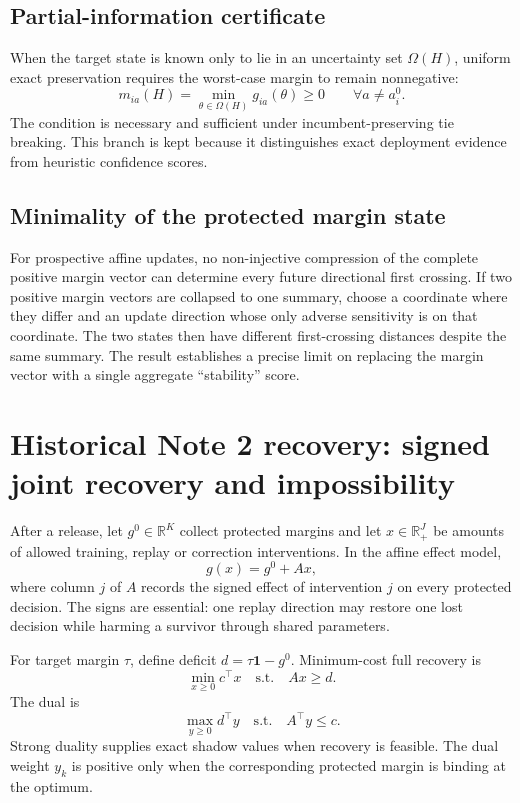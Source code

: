 \documentclass[11pt,letterpaper]{article}
\theoremstyle{plain}
\newcommand{\R}{\mathbb R}
\newcommand{\1}{\mathbf 1}
\begin{document}
\subsection{Partial-information certificate}
When the target state is known only to lie in an uncertainty set $\Omega(H)$, uniform exact preservation requires the worst-case margin to remain nonnegative:
\begin{equation}
 m_{ia}(H)=\min_{\theta\in\Omega(H)}g_{ia}(\theta)\ge0\qquad\forall a\ne a_i^0.
\end{equation}
The condition is necessary and sufficient under incumbent-preserving tie breaking. This branch is kept because it distinguishes exact deployment evidence from heuristic confidence scores.

\subsection{Minimality of the protected margin state}
For prospective affine updates, no non-injective compression of the complete positive margin vector can determine every future directional first crossing. If two positive margin vectors are collapsed to one summary, choose a coordinate where they differ and an update direction whose only adverse sensitivity is on that coordinate. The two states then have different first-crossing distances despite the same summary. The result establishes a precise limit on replacing the margin vector with a single aggregate ``stability'' score.

\clearpage
\section{Historical Note 2 recovery: signed joint recovery and impossibility}
After a release, let $g^0\in\R^K$ collect protected margins and let $x\in\R_+^J$ be amounts of allowed training, replay or correction interventions. In the affine effect model,
\begin{equation}
 g(x)=g^0+Ax,
\end{equation}
where column $j$ of $A$ records the signed effect of intervention $j$ on every protected decision. The signs are essential: one replay direction may restore one lost decision while harming a survivor through shared parameters.

For target margin $\tau$, define deficit $d=\tau\1-g^0$. Minimum-cost full recovery is
\begin{equation}
 \min_{x\ge0}c^\top x\quad\text{s.t.}\quad Ax\ge d.
\end{equation}
The dual is
\begin{equation}
 \max_{y\ge0}d^\top y\quad\text{s.t.}\quad A^\top y\le c.
\end{equation}
Strong duality supplies exact shadow values when recovery is feasible. The dual weight $y_k$ is positive only when the corresponding protected margin is binding at the optimum.
\end{document}
